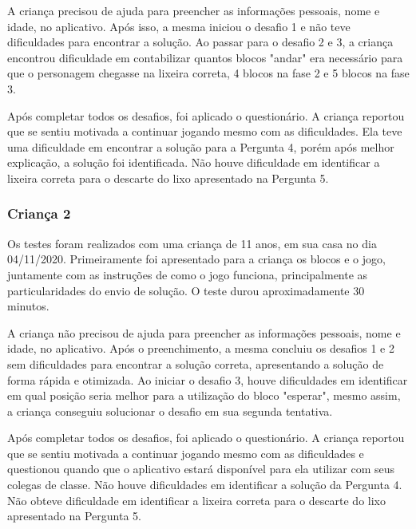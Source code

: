 A criança precisou de ajuda para preencher as informações pessoais, nome e idade, no aplicativo. Após isso, a mesma iniciou o desafio 1 e não teve dificuldades para encontrar a solução. Ao passar para o desafio 2 e 3, a criança encontrou dificuldade em contabilizar quantos blocos "andar" era necessário para que o personagem chegasse na lixeira correta, 4 blocos na fase 2 e 5 blocos na fase 3.

Após completar todos os desafios, foi aplicado o questionário. A criança reportou que se sentiu motivada a continuar jogando mesmo com as dificuldades. Ela teve uma dificuldade em encontrar a solução para a Pergunta 4, porém após melhor explicação, a solução foi identificada. Não houve dificuldade em identificar a lixeira correta para o descarte do lixo apresentado na Pergunta 5. 

\subsubsection{Criança 2}

Os testes foram realizados com uma criança de 11 anos, em sua casa no dia 04/11/2020. Primeiramente foi apresentado para a criança os blocos e o jogo, juntamente com as instruções de como o jogo funciona, principalmente as particularidades do envio de solução. O teste durou aproximadamente 30 minutos.

A criança não precisou de ajuda para preencher as informações pessoais, nome e idade, no aplicativo. Após o preenchimento, a mesma concluiu os desafios 1 e 2 sem dificuldades para encontrar a solução correta, apresentando a solução de forma rápida e otimizada. Ao iniciar o desafio 3, houve dificuldades em identificar em qual posição seria melhor para a utilização do bloco "esperar", mesmo assim, a criança conseguiu solucionar o desafio em sua segunda tentativa.

Após completar todos os desafios, foi aplicado o questionário. A criança reportou que se sentiu motivada a continuar jogando mesmo com as dificuldades e questionou quando que o aplicativo estará disponível para ela utilizar com seus colegas de classe.  Não houve dificuldades em identificar a solução da Pergunta 4. Não obteve dificuldade em identificar a lixeira correta para o descarte do lixo apresentado na Pergunta 5. 